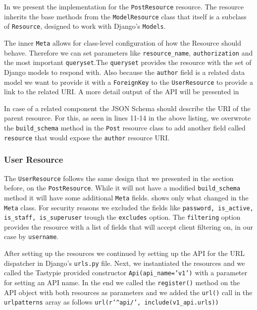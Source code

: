 In  we present the implementation for the \texttt{PostResource} resource. The resource inherits the base methods from the \texttt{ModelResource} class that itself is a subclass of \texttt{Resource}, designed to work with Django’s \texttt{Models}. 

	

The inner \texttt{Meta} allows for class-level configuration of how the Resource should behave. Therefore we can set parameters like \texttt{resource\_name}, \texttt{authorization} and the most important \texttt{queryset}.The \texttt{queryset} provides the resource with the set of Django models to respond with. Also because the \texttt{author} field is a related data model we want to provide it with a \texttt{ForeignKey} to the \texttt{UserResource} to provide a link to the related URI. A more detail output of the API will be presented in

In case of a related component the JSON Schema should describe the URI of the parent resource. For this, as seen in lines 11-14 in the above listing,  we overwrote the \texttt{build\_schema} method in the \texttt{Post} resource class to add another field called \texttt{resource} that would expose the \texttt{author} resource URI.


\subsubsection{User Resource}
\label{sub-sub-sec:user-resource}

The \texttt{UserResource} follows the same design that we presented in the section before, on the \texttt{PostResource}. While it will not have a modified \texttt{build\_schema} method it will have some additional \texttt{Meta} fields.  shows only what changed in the \texttt{Meta} class. For security reasons we excluded the fields like \texttt{password, is\_active, is\_staff, is\_superuser} trough the \texttt{excludes} option. The \texttt{filtering} option provides the resource with a list of fields that will accept client filtering on, in our case by \texttt{username}.



After setting up the resources we continued by setting up the API for the URL dispatcher in Django's \texttt{urls.py} file. Next, we instantiated the resources and we called the Tastypie provided constructor \texttt{Api(api\_name='v1')} with a parameter for setting an API name. In the end we called the \texttt{register()} method on the API object with both resources as parameters and we added the \texttt{url()} call in the \texttt{urlpatterns} array as follows \texttt{url(r'\^{}api/', include(v1\_api.urls))}

